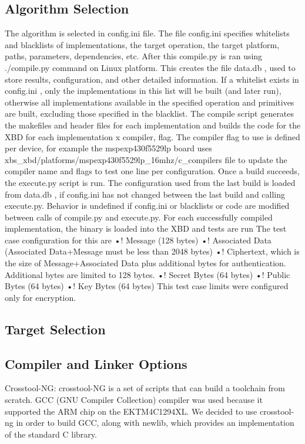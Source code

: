 \documentclass[twoside,11pt]{cergdoc}
\begin{document}
    \subsection{Algorithm Selection}
The algorithm is selected in config.ini
file. The file config.ini specifies whitelists
and blacklists of implementations,
the target operation, the target platform,
paths, parameters, dependencies, etc.
After this compile.py is ran using
./compile.py command on Linux platform.
This creates the file data.db , used to store
results, configuration, and other detailed
information.
If a whitelist exists in config.ini ,
only the implementations in this list will be
built (and later run), otherwise all
implementations available in the specified
operation and primitives are built, excluding
those specified in the blacklist. The compile
script generates the makefiles and header
files for each implementation and builds the
code for the XBD for each implementation
x {compiler, flag}. The compiler flag to use
is defined per device, for example the mspexp430f5529lp
board uses
xbs\_xbd/platforms/mspexp430f5529lp\_16mhz/c\_compilers file to
update the compiler name and flags to test
one line per configuration. Once a build
succeeds, the execute.py script is run. The
configuration used from the last build is
loaded from data.db , if config.ini has not
changed between the last build and calling
execute.py. Behavior is undefined if
config.ini or blacklists or code are modified
between calls of compile.py and execute.py.
For each successfully compiled
implementation, the binary
is loaded into the XBD and tests are run
The test case configuration for this are
•! Message (128 bytes)
•! Associated Data (Associated
Data+Message must be less than
2048 bytes)
•! Ciphertext, which is the size of
Message+Associated Data plus
additional bytes for authentication.
Additional bytes are limited to 128
bytes.
•! Secret Bytes (64 bytes)
•! Public Bytes (64 bytes)
•! Key Bytes (64 bytes)
This test case limits were configured
only for encryption.


    \subsection{Target Selection}
    \subsection{Compiler and Linker Options}
Crosstool-NG: crosstool-NG is a set of
scripts that can build a toolchain from
scratch. GCC (GNU Compiler
Collection) compiler was used because it
supported the ARM chip on the EKTM4C1294XL.
We decided to use
crosstool-ng in order to build GCC,
along with newlib, which provides an
implementation of the standard C
library.
\end{document}
